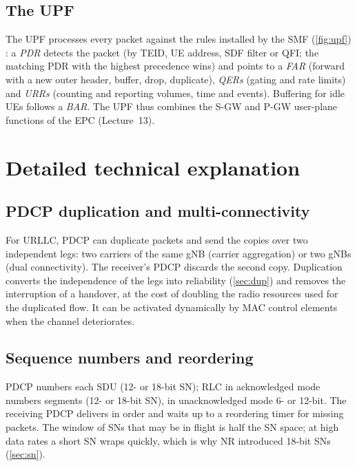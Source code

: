 \documentclass[11pt,a4paper]{article}
\begin{document}
\begin{acnfigure}
  \caption{Selected RAN functional splits with indicative fronthaul rates (assumptions in \cref{sec:fh}).}
  \label{fig:splits}
\end{acnfigure}

\subsection{The UPF}
The UPF processes every packet against the rules installed by the SMF (\cref{fig:upf}) \cite{ts29244}: a \emph{PDR} detects the packet
(by TEID, UE address, SDF filter or QFI; the matching PDR with the highest precedence wins) and points to a \emph{FAR} (forward with a new
outer header, buffer, drop, duplicate), \emph{QERs} (gating and rate limits) and \emph{URRs} (counting and reporting volumes, time and
events). Buffering for idle UEs follows a \emph{BAR}. The UPF thus combines the S-GW and P-GW user-plane functions of the EPC (Lecture~13).

\begin{acnfigure}
  \caption{UPF packet processing with PFCP rules.}
  \label{fig:upf}
\end{acnfigure}

\section{Detailed technical explanation}

\subsection{PDCP duplication and multi-connectivity}
For URLLC, PDCP can duplicate packets and send the copies over two independent legs: two carriers of the same gNB (carrier aggregation)
or two gNBs (dual connectivity). The receiver's PDCP discards the second copy. Duplication converts the independence of the legs into
reliability (\cref{sec:dup}) and removes the interruption of a handover, at the cost of doubling the radio resources used for the duplicated
flow. It can be activated dynamically by MAC control elements when the channel deteriorates.

\subsection{Sequence numbers and reordering}
PDCP numbers each SDU (12- or 18-bit SN); RLC in acknowledged mode numbers segments (12- or 18-bit SN), in unacknowledged mode 6- or 12-bit. The
receiving PDCP delivers in order and waits up to a reordering timer for missing packets. The window of SNs that may be in flight is half the
SN space; at high data rates a short SN wraps quickly, which is why NR introduced 18-bit SNs (\cref{sec:sn}).
\end{document}
